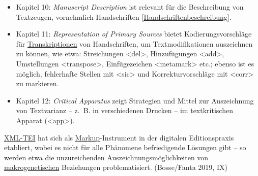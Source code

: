 \documentclass{article}
\begin{document}
        \begin{itemize}\item {Kapitel 10: \emph{Manuscript Description}  ist relevant für die Beschreibung von Textzeugen, vornehmlich Handschriften [\href{http://gams.uni-graz.at/o:konde.92}{Handschriftenbeschreibung}].}\item {Kapitel 11: \emph{Representation of Primary Sources} bietet Kodierungsvorschläge für \href{http://gams.uni-graz.at/o:konde.197}{Transkriptionen} von Handschriften, um Textmodifikationen auszeichnen zu können, wie etwa: Streichungen <del>, Hinzufügungen <add>, Umstellungen <transpose>, Einfügezeichen <metamark> etc.; ebenso ist es möglich, fehlerhafte Stellen mit <sic> und Korrekturvorschläge mit <corr> zu markieren.}\item {Kapitel 12: \emph{Critical Apparatus} zeigt Strategien und Mittel zur Auszeichnung von Textvarianz – z. B. in verschiedenen Drucken – im textkritischen Apparat (<app>).}\end{itemize}\href{http://gams.uni-graz.at/o:konde.178}{XML-TEI} hat sich als \href{http://gams.uni-graz.at/o:konde.126}{Markup}-Instrument in der digitalen Editionspraxis etabliert, wobei es nicht für alle Phänomene befriedigende Lösungen gibt – so werden etwa die unzureichenden Auszeichnungsmöglichkeiten von \href{http://gams.uni-graz.at/o:konde.23}{makrogenetischen} Beziehungen problematisiert. (Bosse/Fanta 2019, IX)\\
            
\end{document}
